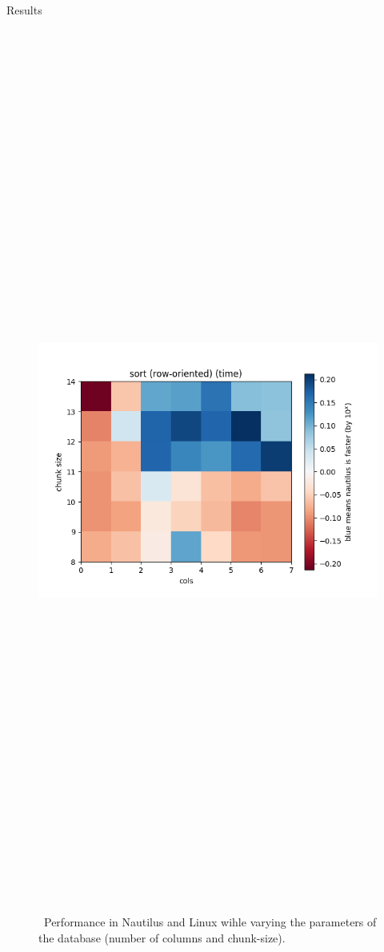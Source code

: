 \begin{block}{Results}
  \begin{figure}
    \includegraphics[height=30cm]{plots/sort_2d.png}
    \caption{~Performance in Nautilus and Linux wihle varying the parameters of the database (number of columns and chunk-size).}
    \label{fig:sort_2d}
  \end{figure}


\end{block}
